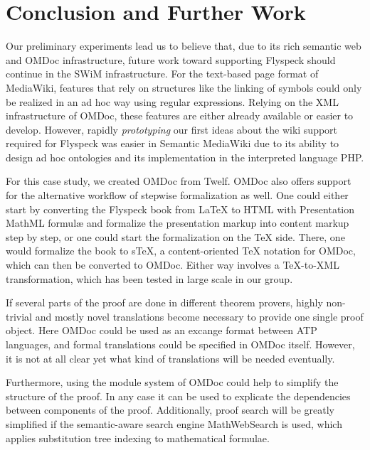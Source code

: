 
\section{Conclusion and Further Work}
\label{sec:conc}

Our preliminary experiments lead us to believe that, due to its rich
semantic web and OMDoc infrastructure, future work toward supporting
Flyspeck should continue in the SWiM infrastructure.  For the text-based
page format of MediaWiki, features that rely on structures like the
linking of symbols could only be realized in an ad hoc way
using regular expressions.  Relying on the XML infrastructure of
OMDoc, these features are either already available or easier to develop.
However, rapidly \emph{prototyping} our first ideas about the wiki
support required for Flyspeck was easier in Semantic MediaWiki due to
its ability to design ad hoc ontologies and its implementation in the
interpreted language PHP.

For this case study, we created OMDoc from Twelf. OMDoc also offers
support for the alternative workflow of stepwise formalization as
well.  One could either start by converting the Flyspeck book from
{\LaTeX} to HTML with Presentation MathML formulæ and formalize the
presentation markup into content markup step by step, or one could
start the formalization on the {\TeX} side.  There, one would
formalize the book to s\TeX{}, a content-oriented {\TeX} notation for
OMDoc, which can then be converted to OMDoc\cite{Kohlhase:albwo06}.
Either way involves a {\TeX}-to-XML transformation, which has been
tested in large scale in our group\cite{URL:arXMLiv}.

If several parts of the proof are done in different theorem provers,
highly non-trivial and mostly novel translations become necessary to
provide one single proof object. Here OMDoc could be used as an
excange format between ATP languages, and formal translations could be
specified in OMDoc itself. However, it is not at all clear yet what
kind of translations will be needed eventually.

Furthermore, using the module system of OMDoc could help to simplify
the structure of the proof. In any case it can be used to explicate
the dependencies between components of the proof. Additionally,
proof search will be greatly simplified if the semantic-aware search engine
MathWebSearch\cite{KohSuc:asemf06} is used, which applies substitution
tree indexing to mathematical formulae.



